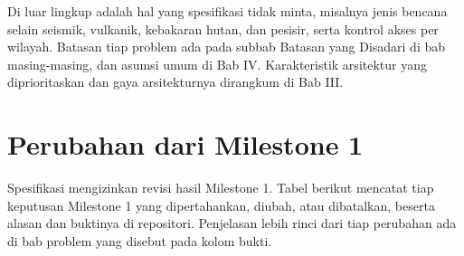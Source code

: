 Di luar lingkup adalah hal yang spesifikasi tidak minta, misalnya jenis bencana selain seismik, vulkanik, kebakaran hutan, dan pesisir, serta kontrol akses per wilayah. Batasan tiap problem ada pada subbab Batasan yang Disadari di bab masing-masing, dan asumsi umum di Bab IV. Karakteristik arsitektur yang diprioritaskan dan gaya arsitekturnya dirangkum di Bab III.

\section{Perubahan dari Milestone 1}

Spesifikasi mengizinkan revisi hasil Milestone 1. Tabel berikut mencatat tiap keputusan Milestone 1 yang dipertahankan, diubah, atau dibatalkan, beserta alasan dan buktinya di repositori. Penjelasan lebih rinci dari tiap perubahan ada di bab problem yang disebut pada kolom bukti.

